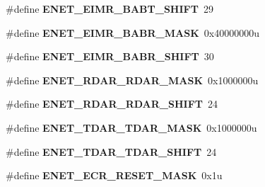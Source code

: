 \begin{DoxyCompactItemize}
\item 
\#define {\bfseries E\+N\+E\+T\+\_\+\+E\+I\+M\+R\+\_\+\+B\+A\+B\+T\+\_\+\+S\+H\+I\+FT}~29\hypertarget{group__ENET__Register__Masks_gad0fc34be1abc0e6059feb0ac0f7e7db1}{}\label{group__ENET__Register__Masks_gad0fc34be1abc0e6059feb0ac0f7e7db1}

\item 
\#define {\bfseries E\+N\+E\+T\+\_\+\+E\+I\+M\+R\+\_\+\+B\+A\+B\+R\+\_\+\+M\+A\+SK}~0x40000000u\hypertarget{group__ENET__Register__Masks_ga58e5d69da07a75b36ef7d5fe01b5275d}{}\label{group__ENET__Register__Masks_ga58e5d69da07a75b36ef7d5fe01b5275d}

\item 
\#define {\bfseries E\+N\+E\+T\+\_\+\+E\+I\+M\+R\+\_\+\+B\+A\+B\+R\+\_\+\+S\+H\+I\+FT}~30\hypertarget{group__ENET__Register__Masks_ga21dfb3f07aa8f8591b954d3a3e91cd81}{}\label{group__ENET__Register__Masks_ga21dfb3f07aa8f8591b954d3a3e91cd81}

\item 
\#define {\bfseries E\+N\+E\+T\+\_\+\+R\+D\+A\+R\+\_\+\+R\+D\+A\+R\+\_\+\+M\+A\+SK}~0x1000000u\hypertarget{group__ENET__Register__Masks_gaf4ddad52a6258f0e5958ab67f26a5a00}{}\label{group__ENET__Register__Masks_gaf4ddad52a6258f0e5958ab67f26a5a00}

\item 
\#define {\bfseries E\+N\+E\+T\+\_\+\+R\+D\+A\+R\+\_\+\+R\+D\+A\+R\+\_\+\+S\+H\+I\+FT}~24\hypertarget{group__ENET__Register__Masks_ga6f04308372016c60e2cb80485451e9d9}{}\label{group__ENET__Register__Masks_ga6f04308372016c60e2cb80485451e9d9}

\item 
\#define {\bfseries E\+N\+E\+T\+\_\+\+T\+D\+A\+R\+\_\+\+T\+D\+A\+R\+\_\+\+M\+A\+SK}~0x1000000u\hypertarget{group__ENET__Register__Masks_ga5758f935dabab51a86c68161bce5be1b}{}\label{group__ENET__Register__Masks_ga5758f935dabab51a86c68161bce5be1b}

\item 
\#define {\bfseries E\+N\+E\+T\+\_\+\+T\+D\+A\+R\+\_\+\+T\+D\+A\+R\+\_\+\+S\+H\+I\+FT}~24\hypertarget{group__ENET__Register__Masks_gae2d1ffef71e20daf95833ce26619b212}{}\label{group__ENET__Register__Masks_gae2d1ffef71e20daf95833ce26619b212}

\item 
\#define {\bfseries E\+N\+E\+T\+\_\+\+E\+C\+R\+\_\+\+R\+E\+S\+E\+T\+\_\+\+M\+A\+SK}~0x1u\hypertarget{group__ENET__Register__Masks_ga3b154308b2f4ab59eb5e0bed4f38cb70}{}\label{group__ENET__Register__Masks_ga3b154308b2f4ab59eb5e0bed4f38cb70}


\end{DoxyCompactItemize}
